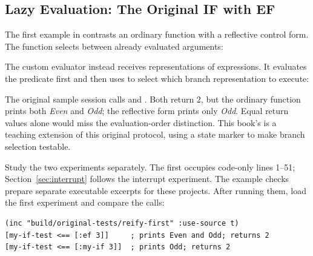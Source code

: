 

\subsection{Lazy Evaluation: The Original IF with EF}
\label{sec:original-if}

The first example in  contrasts
an ordinary function with a reflective control form.
The function  selects between already evaluated arguments:


The custom evaluator instead receives representations of expressions.
It evaluates the predicate first and then uses  to select which
branch representation to execute:


The original sample session calls \code{[:ef 3]} and \code{[:my-if 3]}.
Both return 2, but the ordinary function prints both \emph{Even} and \emph{Odd};
the reflective form prints only \emph{Odd}. Equal return values alone would
miss the evaluation-order distinction.
This book's  is a teaching extension of this
original protocol, using a state marker to make branch selection testable.

Study the two experiments separately. The first occupies code-only lines
1--51; Section~\ref{sec:interrupt} follows the interrupt experiment.
The example checks prepare separate executable excerpts for these projects.
After running them, load the first experiment and compare the calls:

\begin{codeblock}
\begin{lstlisting}
(inc "build/original-tests/reify-first" :use-source t)
[my-if-test <== [:ef 3]]     ; prints Even and Odd; returns 2
[my-if-test <== [:my-if 3]]  ; prints Odd; returns 2
\end{lstlisting}
\end{codeblock}









